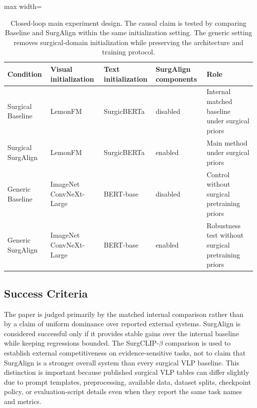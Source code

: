 \begin{table}[t]
\centering
\scriptsize
\setlength{\tabcolsep}{4pt}
\renewcommand{\arraystretch}{1.1}
\caption{Closed-loop main experiment design. The causal claim is tested by comparing Baseline and SurgAlign within the same initialization setting. The generic setting removes surgical-domain initialization while preserving the architecture and training protocol.}
\label{tab:main_2x2_design}
\begin{adjustbox}{max width=\textwidth}
\begin{tabular}{@{}lllll@{}}
\toprule
Condition & Visual initialization & Text initialization & SurgAlign components & Role \\
\midrule
Surgical Baseline & LemonFM & SurgicBERTa & disabled & Internal matched baseline under surgical priors \\
Surgical SurgAlign & LemonFM & SurgicBERTa & enabled & Main method under surgical priors \\
Generic Baseline & ImageNet ConvNeXt-Large & BERT-base & disabled & Control without surgical pretraining priors \\
Generic SurgAlign & ImageNet ConvNeXt-Large & BERT-base & enabled & Robustness test without surgical pretraining priors \\
\bottomrule
\end{tabular}
\end{adjustbox}
\end{table}

\subsection{Success Criteria}
\label{sec:exp_success}

The paper is judged primarily by the matched internal comparison rather than by a claim of uniform dominance over reported external systems. SurgAlign is considered successful only if it provides stable gains over the internal baseline while keeping regressions bounded. The SurgCLIP-$\beta$ comparison is used to establish external competitiveness on evidence-sensitive tasks, not to claim that SurgAlign is a stronger overall system than every surgical VLP baseline. This distinction is important because published surgical VLP tables can differ slightly due to prompt templates, preprocessing, available data, dataset splits, checkpoint policy, or evaluation-script details even when they report the same task names and metrics.

